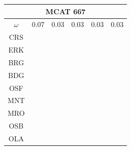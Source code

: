 \documentclass[12pt]{article}
\begin{document}
\begin{landscape}
\begin{figure}
{\begin{minipage}[c]{0.3\textwidth}
\hspace*{-2.5cm}
\begin{tabular}{|c|c|c|c|c|c|}%
         \hline \multicolumn{6}{|c|}{MCAT 667} \\ \hline
         $\omega$&0.07&0.03&0.03&0.03&0.03\\ \hline %
        CRS&\cellcolor[HTML]{E41A1C}&\cellcolor[HTML]{E41A1C}&\cellcolor[HTML]{E41A1C}&\cellcolor[HTML]{E41A1C}&\cellcolor[HTML]{E41A1C}\\ \hline %
        ERK&\cellcolor[HTML]{377EB8}&\cellcolor[HTML]{E41A1C}&\cellcolor[HTML]{E41A1C}&\cellcolor[HTML]{377EB8}&\cellcolor[HTML]{E41A1C}\\ \hline %
        BRG&\cellcolor[HTML]{4DAF4A}&\cellcolor[HTML]{E41A1C}&\cellcolor[HTML]{E41A1C}&\cellcolor[HTML]{377EB8}&\cellcolor[HTML]{E41A1C}\\ \hline %
        BDG&\cellcolor[HTML]{4DAF4A}&\cellcolor[HTML]{377EB8}&\cellcolor[HTML]{377EB8}&\cellcolor[HTML]{377EB8}&\cellcolor[HTML]{377EB8}\\ \hline %
        OSF&\cellcolor[HTML]{4DAF4A}&\cellcolor[HTML]{377EB8}&\cellcolor[HTML]{377EB8}&\cellcolor[HTML]{4DAF4A}&\cellcolor[HTML]{4DAF4A}\\ \hline %
        MNT&\cellcolor[HTML]{984EA3}&\cellcolor[HTML]{4DAF4A}&\cellcolor[HTML]{377EB8}&\cellcolor[HTML]{4DAF4A}&\cellcolor[HTML]{4DAF4A}\\ \hline %
        MRO&\cellcolor[HTML]{984EA3}&\cellcolor[HTML]{4DAF4A}&\cellcolor[HTML]{4DAF4A}&\cellcolor[HTML]{984EA3}&\cellcolor[HTML]{984EA3}\\ \hline %
        OSB&\cellcolor[HTML]{FF7F00}&\cellcolor[HTML]{984EA3}&\cellcolor[HTML]{984EA3}&\cellcolor[HTML]{FF7F00}&\cellcolor[HTML]{FF7F00}\\ \hline %
        OLA&\cellcolor[HTML]{FF7F00}&\cellcolor[HTML]{984EA3}&\cellcolor[HTML]{984EA3}&\cellcolor[HTML]{FF7F00}&\cellcolor[HTML]{FF7F00}\\ \hline %

\end{tabular}
\end{minipage}}
\end{figure}
\end{landscape}
\end{document}

